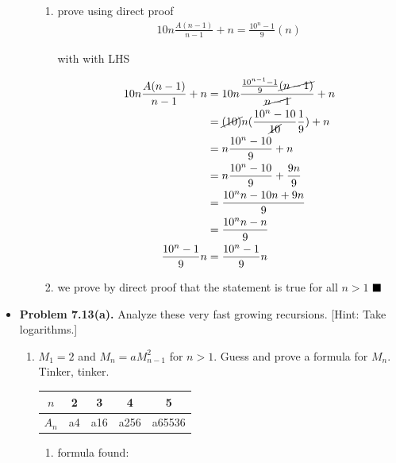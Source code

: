 \documentclass{article}
\begin{document}
\begin{itemize}
\begin{enumerate}[label=(c)]
\begin{enumerate}[label=\roman*.]
                \item prove using direct proof
                \begin{align*}
                    10n\frac{A(n-1)}{n-1} + n = \frac{10^n-1}{9}(n)
                \end{align*}
                \begin{center}
                    with with LHS
                \end{center}
                \begin{align*}
                    10n\frac{A(n-1)}{n-1} + n &= 10n \frac{\frac{10^{n-1}-1}{9}\cancel{(n-1)}}{\cancel{n-1}} + n\\
                                              &= \cancel{(10)}n(\frac{10^n - 10}{\cancel{10}}\frac{1}{9}) + n\\
                                              &= n \frac{10^n - 10}{9} + n\\
                                              &= n \frac{10^n - 10}{9} + \frac{9n}{9}\\
                                              &= \frac{10^nn - 10n + 9n}{9}\\
                                              &= \frac{10^nn - n}{9}\\
                            \frac{10^n-1}{9}n &= \frac{10^n-1}{9}n
                \end{align*}
                \item we prove by direct proof that the statement is true for all $n > 1$ $\hfill \blacksquare$
            \end{enumerate}
        \end{enumerate}
        \item \textbf{Problem 7.13(a).} Analyze these very fast growing recursions. [Hint: Take logarithms.]
        \begin{enumerate}[label=(a)]
            \item $M_1 = 2$ and $M_n = aM^2_{n-1}$ for $n>1$. Guess and prove a formula for $M_n$. Tinker, tinker.
            \begin{tabular}{ |c|c|c|c|c| } 
                \hline
                $n$ & 2 & 3 & 4 & 5\\ 
                \hline
                $A_n$ & a4 & a16 & a256 & a65536 \\
                \hline
            \end{tabular}
            \begin{enumerate}[label=(\roman*)]
                \item formula found:

\end{enumerate}
\end{enumerate}
\end{itemize}
\end{document}
